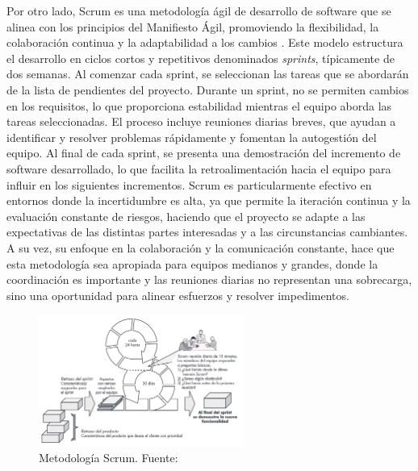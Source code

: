 Por otro lado, Scrum es una metodología ágil de desarrollo de software que se alinea con los principios del Manifiesto Ágil, promoviendo la flexibilidad, la colaboración continua y la adaptabilidad a los cambios \cite{pressman2010ingenieria}. Este modelo estructura el desarrollo en ciclos cortos y repetitivos denominados \textit{sprints}, típicamente de dos semanas. Al comenzar cada sprint, se seleccionan las tareas que se abordarán de la lista de pendientes del proyecto. Durante un sprint, no se permiten cambios en los requisitos, lo que proporciona estabilidad mientras el equipo aborda las tareas seleccionadas. El proceso incluye reuniones diarias breves, que ayudan a identificar y resolver problemas rápidamente y fomentan la autogestión del equipo. Al final de cada sprint, se presenta una demostración del incremento de software desarrollado, lo que facilita la retroalimentación hacia el equipo para influir en los siguientes incrementos. Scrum es particularmente efectivo en entornos donde la incertidumbre es alta, ya que permite la iteración continua y la evaluación constante de riesgos, haciendo que el proyecto se adapte a las expectativas de las distintas partes interesadas y a las circunstancias cambiantes. A su vez, su enfoque en la colaboración y la comunicación constante, hace que esta metodología sea apropiada para equipos medianos y grandes, donde la coordinación es importante y las reuniones diarias no representan una sobrecarga, sino una oportunidad para alinear esfuerzos y resolver impedimentos.

\begin{figure}[!htb]
    \centering
    \includegraphics[width=0.6\textwidth]{Figures/model-scrum.png}
    \caption{Metodología Scrum. Fuente: \cite{pressman2010ingenieria}}
\end{figure}

